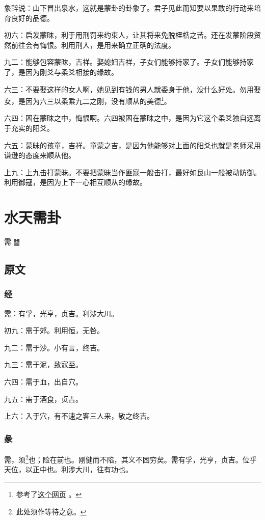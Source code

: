 \documentclass[12pt,oneside]{book}
\begin{document}
象辞说：山下冒出泉水，这就是蒙卦的卦象了。君子见此而知要以果敢的行动来培育良好的品德。

初六：启发蒙昧，利于用刑罚来约束人，让其将来免脱桎梏之苦。还在发蒙阶段贸然前往会有悔恨。利用刑人，是用来确立正确的法度。

九二：能够包容蒙昧，吉祥。娶媳妇吉祥，子女们能够持家了。子女们能够持家了，是因为刚爻与柔爻相接的缘故。

六三：不要娶这样的女人啊，她见到有钱的男人就委身于他，没什么好处。勿用娶女，是因为六三以柔乘九二之刚，没有顺从的美德\footnote{参考了\href{http://www.guoxuez.com/64gua/menggua/23431.html}{这个网页} 。}。

六四：困在蒙昧之中，悔恨啊。六四被困在蒙昧之中，是因为它这个柔爻独自远离于充实的阳爻。

六五：蒙昧的孩童，吉祥。童蒙之吉，是因为他能够对上面的阳爻也就是老师采用谦逊的态度来顺从他。

上九：上九击打蒙昧。不要把蒙昧当作匪寇一般击打，最好如艮山一般被动防御。利用御寇，是因为上下一心相互顺从的缘故。




\chapter{水天需卦}
需 {\Large ䷄}

\section{原文}

\subsection{经}
需：有孚，光亨，贞吉。利涉大川。

初九：需于郊。利用恒，无咎。

九二：需于沙。小有言，终吉。

九三：需于泥，致寇至。

六四：需于血，出自穴。

九五：需于酒食，贞吉。

上六：入于穴，有不速之客三人来，敬之终吉。

\subsection{彖}
需，须\footnote{此处须作等待之意。}也；险在前也。刚健而不陷，其义不困穷矣。需有孚，光亨，贞吉。位乎天位，以正中也。利涉大川，往有功也。
\end{document}
